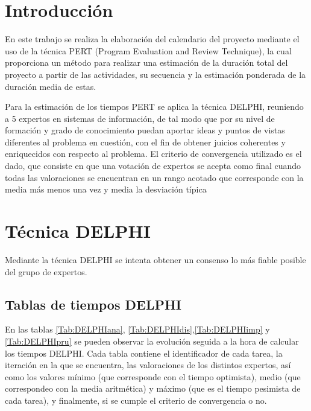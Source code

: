 \documentclass[11pt,a4paper,spanish,twoside]{report}
\begin{document}
\tableofcontents


\chapter*{Introducción}
En este trabajo se realiza la elaboración del calendario del proyecto
mediante el uso de la técnica PERT (Program Evaluation and Review Technique),
la cual proporciona un método para realizar una estimación de la duración
total del proyecto a partir de las actividades, su secuencia y la estimación
ponderada de la duración media de estas. 

Para la estimación de los tiempos PERT se aplica la técnica DELPHI, reuniendo
a 5 expertos en sistemas de información, de tal modo que por su nivel de
formación y grado de 
conocimiento puedan aportar ideas y puntos de vistas diferentes al problema
en cuestión, con el fin de obtener juicios coherentes y enriquecidos con
respecto al problema. El criterio de convergencia utilizado es el dado, que
consiste en que una votación de expertos se acepta como final cuando todas
las valoraciones se encuentran en un rango acotado que corresponde
con la media más menos una vez y media la desviación típica

\chapter{Técnica DELPHI}
Mediante la técnica DELPHI se intenta obtener un consenso lo más fiable
posible del grupo de expertos.
    
\section{Tablas de tiempos DELPHI}
En las tablas \ref{Tab:DELPHIana}, \ref{Tab:DELPHIdis},\ref{Tab:DELPHIimp} y
\ref{Tab:DELPHIpru} se
pueden observar la evolución seguida a la hora de calcular los tiempos
DELPHI. Cada tabla contiene el identificador de cada tarea, la iteración en
la que se encuentra, las valoraciones de los distintos expertos, así como los
valores mínimo (que corresponde con el tiempo optimista), medio (que
correspondeo con la media aritmética) y máximo (que es el tiempo pesimista de
cada tarea), y finalmente, si se cumple el criterio de convergencia o no.
\end{document}
